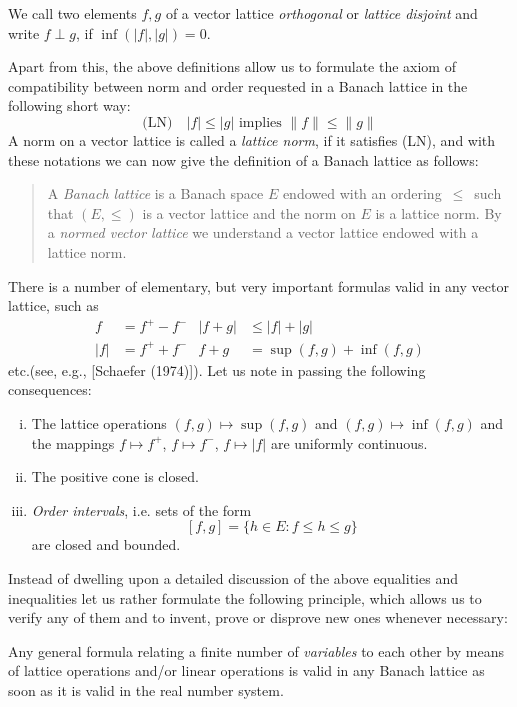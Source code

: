 We call two elements $ f, g $ of a vector lattice \emph{orthogonal} or \emph{lattice disjoint} and write $ f \perp g $, if $ \inf(|f|,|g|) = 0 $.

Apart from this, the above definitions allow us to formulate the axiom of compatibility between norm and order requested in a Banach lattice in the following short way:
\begin{equation*}\label{eq:c1-1}
\text{(LN)} \quad |f| \leq |g| \text{ implies } \|f\| \leq \|g\|
\end{equation*}
A norm on a vector lattice is called a \emph{lattice norm}, if it satisfies (LN), and with these notations we can now give the definition of a Banach lattice as follows:
\begin{quote}
A \emph{Banach lattice} is a Banach space $ E $ endowed with an ordering $ \,\leq\, $ such that $ (E,\leq) $ is a vector lattice and the norm on $ E $ is a lattice norm.
By a \emph{normed vector lattice} we understand a vector lattice endowed with a lattice norm.
\end{quote}

There is a number of elementary, but very important formulas valid in any vector lattice, such as
\begin{align*}
f &= f^{+} - f^{-} & |f + g| &\leq |f| + |g| \\
|f| &= f^{+} + f^{-} & f + g &= \sup(f,g) + \inf(f,g)
\end{align*}
etc.\xspace (see, e.g., [Schaefer (1974)]).
Let us note in passing the following consequences:
%
\begin{enumerate}[(i)]
\item The lattice operations $ (f,g) \mapsto \sup(f,g) $ and $ (f,g) \mapsto \inf(f,g) $ and the mappings $ f \mapsto f^{+} $, $ f \mapsto f^{-} $, $ f \mapsto |f| $ are uniformly continuous.
\item The positive cone is closed.
\item \emph{Order intervals}, i.e. sets of the form
\[
[f,g] = \{ h \in E \colon f \leq h \leq g \}
\]
are closed and bounded.
\end{enumerate}
Instead of dwelling upon a detailed discussion of the above equalities and inequalities let us rather formulate the following principle,
\pagebreak
which allows us to verify any of them and to invent, prove or disprove new ones whenever necessary:

Any general formula relating a finite number of \emph{variables} to each other by means of lattice operations and/or linear operations is valid in any Banach lattice as soon as it is valid in the real number system.

